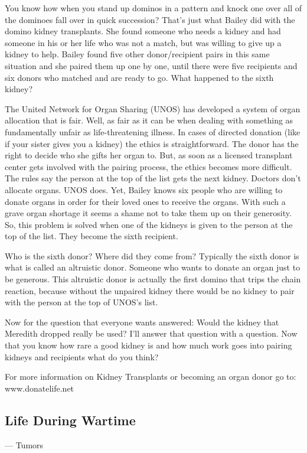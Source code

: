 \documentclass[12pt,a4paper,onecolumn]{article}
\begin{document}
You know how when you stand up dominos in a pattern and knock one over all of the dominoes fall over
in quick succession? That's just what Bailey did with the domino kidney transplants. She found
someone who needs a kidney and had someone in his or her life who was not a match, but was willing
to give up a kidney to help. Bailey found five other donor/recipient pairs in this same situation
and she paired them up one by one, until there were five recipients and six donors who matched and
are ready to go. What happened to the sixth kidney?

The United Network for Organ Sharing (UNOS) has developed a system of organ allocation that is fair.
Well, as fair as it can be when dealing with something as fundamentally unfair as life-threatening
illness. In cases of directed donation (like if your sister gives you a kidney) the
ethic\cite{ethic}s is straightforward. The donor has the right to decide who she gifts her organ to.
But, as soon as a licensed transplant center gets involved with the pairing process, the ethics
becomes more difficult. The rules say the person at the top of the list gets the next kidney.
Doctors don't allocate organs. UNOS does. Yet, Bailey knows six people who are willing to donate
organs in order for their loved ones to receive the organs. With such a grave\cite{grave} organ
shortage it seems a shame not to take them up on their generosity\cite{generosity}. So, this problem
is solved when one of the kidneys is given to the person at the top of the list. They become the
sixth recipient.

Who is the sixth donor? Where did they come from? Typically the sixth donor is what is called an
altruistic\cite{altruistic} donor. Someone who wants to donate an organ just to be generous. This
altruistic donor is actually the first domino that trips the chain reaction, because without the
unpaired kidney there would be no kidney to pair with the person at the top of UNOS's list.

Now for the question that everyone wants answered: Would the kidney that Meredith dropped really be
used? I'll answer that question with a question. Now that you know how rare a good kidney is and how
much work goes into pairing kidneys and recipients what do you think?

For more information on Kidney Transplants or becoming an organ donor go to: www.donatelife.net


\subsection{Life During Wartime}
\begin{flushright} --- Tumors
\end{flushright}
\end{document}
